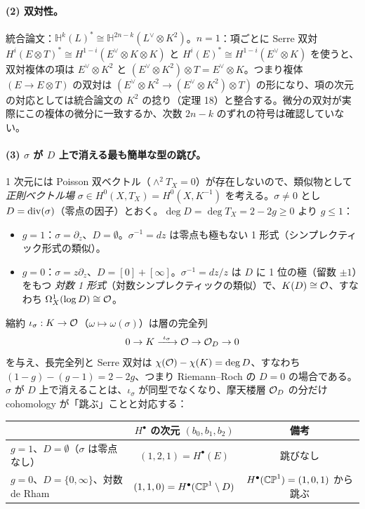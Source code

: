 \paragraph{(2) 双対性。}統合論文：$\mathbb H^k(L)^*\cong\mathbb H^{2n-k}(L^\vee\otimes K^2)$。$n=1$：項ごとに Serre 双対 $H^i(E\otimes T)^*\cong H^{1-i}(E^\vee\otimes K\otimes K)$ と $H^i(E)^*\cong H^{1-i}(E^\vee\otimes K)$ を使うと、双対複体の項は $E^\vee\otimes K^2$ と $(E^\vee\otimes K^2)\otimes T=E^\vee\otimes K$。つまり複体 $(E\to E\otimes T)$ の双対は $(E^\vee\otimes K^2\to(E^\vee\otimes K^2)\otimes T)$ の形になり、項の次元の対応としては統合論文の $K^2$ の捻り（定理 18）と整合する。微分の双対が実際にこの複体の微分に一致するか、次数 $2n-k$ のずれの符号は確認していない。\tQ
\paragraph{(3) $\sigma$ が $D$ 上で消える最も簡単な型の跳び。}1 次元には Poisson 双ベクトル（$\wedge^2T_X=0$）が存在しないので、類似物として \emph{正則ベクトル場} $\sigma\in H^0(X,T_X)=H^0(X,K^{-1})$ を考える。$\sigma\ne0$ とし $D=\operatorname{div}(\sigma)$（零点の因子）とおく。$\deg D=\deg T_X=2-2g\ge0$ より $g\le1$：
\begin{itemize}
\item $g=1$：$\sigma=\partial_z$、$D=\emptyset$。$\sigma^{-1}=dz$ は零点も極もない 1 形式（シンプレクティック形式の類似）。
\item $g=0$：$\sigma=z\partial_z$、$D=[0]+[\infty]$。$\sigma^{-1}=dz/z$ は $D$ に 1 位の極（留数 $\pm1$）をもつ \emph{対数 1 形式}（対数シンプレクティックの類似）で、$K(D)\cong\mathcal O$、すなわち $\Omega^1_X(\log D)\cong\mathcal O$。
\end{itemize}
縮約 $\iota_\sigma:K\to\mathcal O$（$\omega\mapsto\omega(\sigma)$）は層の完全列
\[
0\to K\xrightarrow{\ \iota_\sigma\ }\Oc\to\Oc_D\to0
\]
を与え、長完全列と Serre 双対は $\chi(\mathcal O)-\chi(K)=\deg D$、すなわち $(1-g)-(g-1)=2-2g$、つまり Riemann--Roch の $D=0$ の場合である。$\sigma$ が $D$ 上で消えることは、$\iota_\sigma$ が同型でなくなり、摩天楼層 $\mathcal O_D$ の分だけ cohomology が「跳ぶ」ことと対応する：
\begin{center}
\begin{tabular}{l|c|c}
\toprule
& $H^\bullet$ の次元 $(b_0,b_1,b_2)$ & 備考\\
\midrule
$g=1$、$D=\emptyset$（$\sigma$ は零点なし） & $(1,2,1)=H^\bullet(E)$ & 跳びなし\\
$g=0$、$D=\{0,\infty\}$、対数 de Rham & $(1,1,0)=H^\bullet(\mathbb{CP}^1\setminus D)$ & $H^\bullet(\mathbb{CP}^1)=(1,0,1)$ から跳ぶ\\
\bottomrule
\end{tabular}
\end{center}

